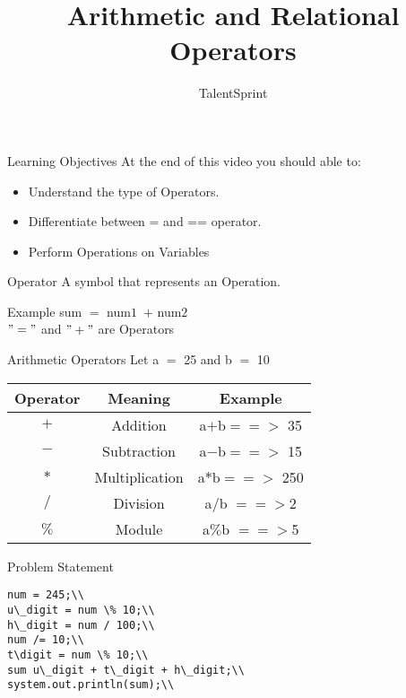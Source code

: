 \documentclass[aspectratio=169,14pt,usenames,dvipsnames]{beamer}
\title[Arithmetic and Relational Operators]{Arithmetic and Relational Operators}
\begin{document}
{\1
\begin{frame} \vspace{35pt}

\subtitle{TalentSprint}
\maketitle
\end{frame}
}


\begin{frame}{Learning Objectives}
At the end of this video you should able to:
\begin{itemize}
\item Understand the type of Operators.
\item Differentiate between = and == operator.
\item Perform Operations on Variables
\end{itemize}
\end{frame}

\begin{frame}{Operator}
A symbol that represents an Operation.
\begin{block}{Example}
sum $=$ num$1$\ $+$ num$2$\\
$"="$ and $"+"$ are Operators
\end{block}
\end{frame}


\begin{frame}{Arithmetic Operators}
Let a $=$ 25 and b $=$ 10\\

\begin{tabular}{|c|c|c|}
\hline 
\textbf{Operator} & \textbf{Meaning} & \textbf{Example}\\

\hline
$+$ & Addition & a$+$b$==>$ 35\\
\hline
$-$ & Subtraction & a$-$b$==>$ 15\\
\hline
$*$ & Multiplication & a$*$b$==>$ 250\\
\hline
$/$ & Division & a$/$b $==>$2\\
\hline
$\%$ & Module & a$\%$b $==>$5\\
\hline
\end{tabular}
\end{frame}

\begin{frame}{Problem Statement}
\begin{lstlisting}
num = 245;\\
u\_digit = num \% 10;\\
h\_digit = num / 100;\\
num /= 10;\\
t\digit = num \% 10;\\
sum u\_digit + t\_digit + h\_digit;\\
system.out.println(sum);\\
\end{lstlisting}
\end{frame}
\end{document}
